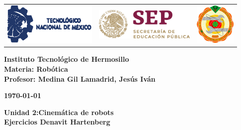 \begin{titlepage}
	\centering
	\begin{tabular}{@{}p{} p{} p{}@{}}
		\includegraphics[height=2cm]{tecnm} & 
		\centering \includegraphics[height=1.5cm]{SEP} & 
		\raggedleft \includegraphics[height=2cm]{ith.jpg} \\
	\end{tabular}
	
	\vspace{2em}
	
	\noindent
	\begin{minipage}[t]{0.48\textwidth}
		\raggedright
		\small \textbf{%
			Instituto Tecnológico de Hermosillo\\
			Materia: Robótica\\
			Profesor: Medina Gil Lamadrid, Jesús Iván%
		}
	\end{minipage}%
	\hfill
	\begin{minipage}[t]{0.48\textwidth}
		\raggedleft
		\small \textbf{\today}
	\end{minipage}
	
	\vspace{2em}
	
	{\large \textbf{Unidad 2:Cinemática de robots}}\\
	{\Huge \textbf{Ejercicios Denavit Hartenberg}}
		
	\vspace{1em}
	

\end{titlepage}
